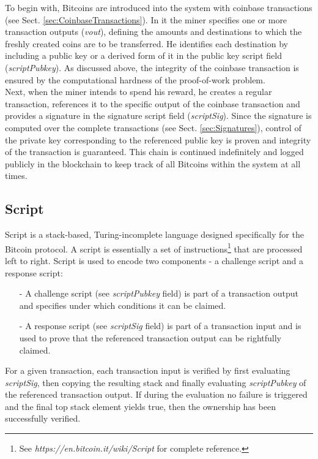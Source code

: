 \noindent
To begin with, Bitcoins are introduced into the system with coinbase transactions (see Sect. \ref{sec:CoinbaseTransactions}). In it the miner specifies one or more transaction outputs (\textit{vout}), defining the amounts and destinations to which the freshly created coins are to be transferred. He identifies each destination by including a public key or a derived form of it in the public key script field (\textit{scriptPubkey}). As discussed above, the integrity of the coinbase transaction is ensured by the computational hardness of the proof-of-work problem.~\\

\noindent
Next, when the miner intends to spend his reward, he creates a regular transaction, references it to the specific output of the coinbase transaction and provides a signature in the signature script field (\textit{scriptSig}). Since the signature is computed over the complete transactions (see Sect. \ref{sec:Signatures}), control of the private key corresponding to the referenced public key is proven and integrity of the transaction is guaranteed. This chain is continued indefinitely and logged publicly in the blockchain to keep track of all Bitcoins within the system at all times.


\subsection{Script} \label{sec:Script}
Script is a stack-based, Turing-incomplete language designed specifically for the Bitcoin protocol. A script is essentially a set of instructions\footnote{See \textit{https://en.bitcoin.it/wiki/Script} for complete reference.} that are processed left to right. Script is used to encode two components - a challenge script and a response script:

\begin{itemize}
\item[-] A challenge script (see \textit{scriptPubkey} field) is part of a transaction output and specifies under which conditions it can be claimed.
\item[-] A response script (see \textit{scriptSig} field) is part of a transaction input and is used to prove that the referenced transaction output can be rightfully claimed.
\end{itemize}

\noindent
For a given transaction, each transaction input is verified by first evaluating \textit{scriptSig}, then copying the resulting stack and finally evaluating \textit{scriptPubkey} of the referenced transaction output. If during the evaluation no failure is triggered and the final top stack element yields true, then the ownership has been successfully verified.~\\

